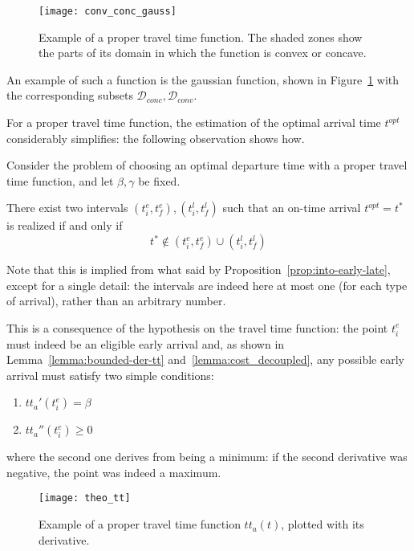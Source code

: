 \begin{figure}
  \centering
  \texttt{[image: conv\_conc\_gauss]}
  \caption{
    Example of a proper travel time function.
  The shaded zones show the parts of its domain in which the function is convex or concave.}
  \label{fig:conc-conv-gauss}
\end{figure}

An example of such a function is the gaussian function,
shown in Figure~\ref{fig:conc-conv-gauss} with the corresponding subsets \(\mathcal{D}_{conc}, \mathcal{D}_{conv}\).

For a proper travel time function,
the estimation of the optimal arrival time \(t^{opt}\) considerably simplifies:
the following observation shows how.
\begin{obs}
  \label{obs:simplified-char}
  Consider the problem of choosing an optimal departure time
  with a proper travel time function, and let \(\beta, \gamma\) be fixed.

  There exist two intervals \((t_i^e, t_f^e), (t_i^l, t_f^l)\) such that an on-time arrival \(t^{opt} = t^*\) is realized if and only if
  \begin{equation*}
    t^* \notin (t_i^e, t_f^e) \cup  (t_i^l, t_f^l)
  \end{equation*}
\end{obs}

Note that this is implied from what said by Proposition~\ref{prop:into-early-late},
except for a single detail:
the intervals are indeed here at most one (for each type of arrival), rather than an arbitrary number.

This is a consequence of the hypothesis on the travel time function:
the point \(t_i^e\) must indeed be an eligible early arrival and,
as shown in Lemma~\ref{lemma:bounded-der-tt} and~\ref{lemma:cost_decoupled},
any possible early arrival must satisfy two simple conditions:
\begin{enumerate}
\item \(tt_a'(t_i^e) = \beta\)
\item \(tt_a''(t_i^e) \geq 0\)
\end{enumerate}
where the second one derives from being a minimum:
if the second derivative was negative, the point was indeed a maximum.

\begin{figure}
  \centering
  \texttt{[image: theo\_tt]}
  \caption{
    Example of a proper travel time function \(tt_a(t)\),
  plotted with its derivative.}
  \label{fig:theo_tt}
\end{figure}

